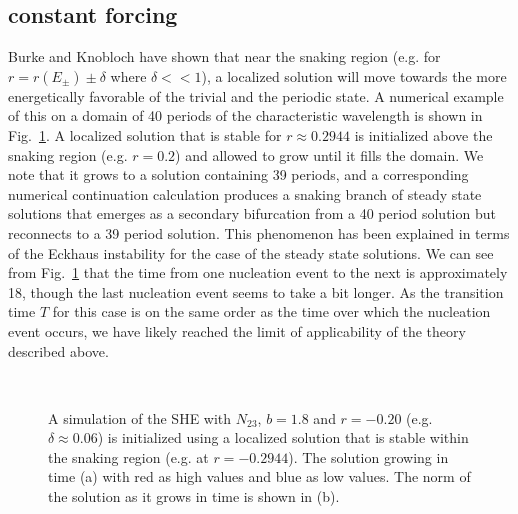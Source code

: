 \documentclass[pre,preprint,superscriptaddress]{revtex4-1}
\begin{document}
\subsection{constant forcing}
Burke and Knobloch \cite{burke2006}  have shown that near the snaking region (e.g. for $r=r(E_{\pm})\pm\delta$ where $\delta <<1$), a localized solution will move towards the more energetically favorable of the trivial and the periodic state.  
A numerical example of this on a domain of 40 periods of the characteristic wavelength is shown in Fig.~\ref{fig:nucleation1}.  A localized solution that is stable for $r\approx 0.2944$ is initialized above the snaking region (e.g. $r=0.2$) and allowed to grow until it fills the domain. We note that it grows to a solution containing 39 periods, and a corresponding numerical continuation calculation produces a snaking branch of steady state solutions that emerges as a secondary bifurcation from a 40 period solution but reconnects to a 39 period solution.  This phenomenon has been explained \cite{bergeon2008} in terms of the Eckhaus instability for the case of the steady state solutions.  We can see from Fig.~\ref{fig:nucleation1} that the time from one nucleation event to the next is approximately 18, though the last nucleation event seems to take a bit longer.  As the transition time $T$ for this case is on the same order as the time over which the nucleation event occurs, we have likely reached the limit of applicability of the theory described above.
\begin{figure}[!htb]
  \begin{center}
    \mbox{
       \quad
      }
    \caption{A simulation of the SHE with $N_{23}$, $b=1.8$ and $r=-0.20$ (e.g. $\delta\approx 0.06$) is initialized using a localized solution that is stable within the snaking region (e.g. at $r=-0.2944$). The solution growing in time (a) with red as high values and blue as low values.  The norm of the solution as it grows in time is shown in (b).}
    \label{fig:nucleation1}
  \end{center}
\end{figure}   
\end{document}

